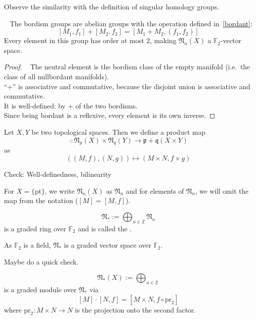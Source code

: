 \documentclass[a4paper,11pt]{article}
\begin{document}
Observe the similarity with the definition of singular homology groups.

\begin{theorem}\ \cite[II, Satz 2.1]{brocker}
    The bordism groups are abelian groups with the operation defined in\ \ref{bordant}:
    \[[M_1,f_1]+[M_2,f_2]=[M_1+M_2,(f_1,f_2)]\]
    Every element in this group has order at most \(2\), making \(\mathfrak{N}_n(X)\) a \(\mathbb{F}_2\)-vector space.
\end{theorem}

\begin{proof}
    \ \cite{brocker}
    The neutral element is the bordism class of the empty manifold (i.e.\ the class of all nullbordant manifolds).\\
    \enquote{+} is associative and commutative, because the disjoint union is associative and commutative.\\
    It is well-defined: by + of the two bordisms.\\
    Since being bordant is a reflexive, every element is its own inverse.
\end{proof}

Let \(X,Y\) be two topological spaces. Then we define a product map
\[\cdot:\mathfrak{N}_p(X)\times\mathfrak{N}_q(Y)\to\mathfrak{p+q}(X\times Y)\]
as
\[((M,f),(N,g))\mapsto (M\times N,f\times g)\]

\begin{remark}
    Check: Well-definedness, bilinearity
\end{remark}

For \(X=\{\mathrm{pt}\}\), we write \(\mathfrak{N}_n(X)\) as \(\mathfrak{N}_n\) and for elements of \(\mathfrak{N}_n\), we will omit the map from the notation (\([M]=[M,f]\)).

\begin{definition}
    \[\mathfrak{N}_\ast:=\bigoplus_{n\in\mathbb{Z}}\mathfrak{N}_n\]
    is a graded ring over \(\mathbb{F}_2\) and is called the .
\end{definition}

\begin{remark}
    As \(\mathbb{F}_2\) is a field, \(\mathfrak{N}_\ast\) is a graded vector space over \(\mathbb{F}_2\).
\end{remark}

Maybe do a quick check.

\begin{definition}
    \[\mathfrak{N}_\ast(X):=\bigoplus_{n\in\mathbb{Z}}\]
    is a graded module over \(\mathfrak{N}_\ast\) via
    \[[M]\cdot[N,f]=[M\times N, f\circ \mathrm{pr}_2]\]
    where \(\mathrm{pr}_2:M\times N\to N\) is the projection onto the second factor.
\end{definition}
\end{document}
